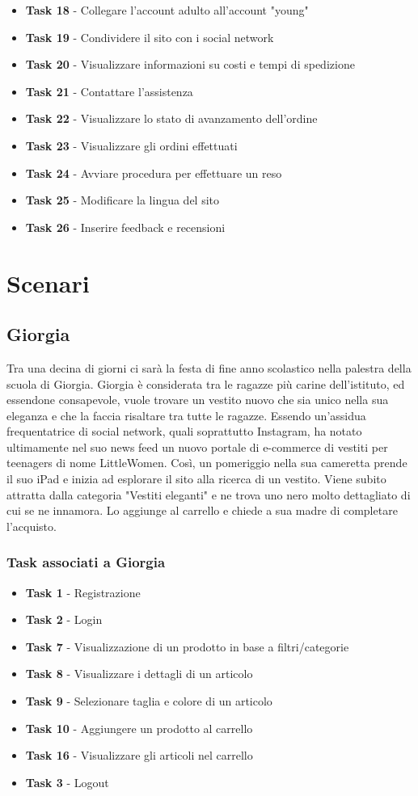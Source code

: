 \documentclass[12pt,a4paper]{report}
\begin{document}
\begin{itemize}
  \item \textbf{Task 18} - Collegare l'account adulto all'account "young"
  \item \textbf{Task 19} - Condividere il sito con i social network
  \item \textbf{Task 20} - Visualizzare informazioni su costi e tempi di spedizione
  \item \textbf{Task 21} - Contattare l'assistenza
  \item \textbf{Task 22} - Visualizzare lo stato di avanzamento dell'ordine
  \item \textbf{Task 23} - Visualizzare gli ordini effettuati
  \item \textbf{Task 24} - Avviare procedura per effettuare un reso
  \item \textbf{Task 25} - Modificare la lingua del sito
  \item \textbf{Task 26} - Inserire feedback e recensioni
\end{itemize}
\section{Scenari}
\subsection*{Giorgia}
Tra una decina di giorni ci sarà la festa di fine anno scolastico nella palestra della scuola di Giorgia. Giorgia è considerata tra le ragazze più carine dell'istituto, ed essendone consapevole, vuole trovare un vestito nuovo che sia unico nella sua eleganza e che la faccia risaltare tra tutte le ragazze. Essendo un'assidua frequentatrice di social network, quali soprattutto Instagram, ha notato ultimamente nel suo news feed un nuovo portale di e-commerce di vestiti per teenagers di nome LittleWomen. Così, un pomeriggio nella sua cameretta prende il suo iPad e inizia ad esplorare il sito alla ricerca di un vestito. Viene subito attratta dalla categoria "Vestiti eleganti" e ne trova uno nero molto dettagliato di cui se ne innamora. Lo aggiunge al carrello e chiede a sua madre di completare l'acquisto.
\subsubsection*{Task associati a Giorgia}
\begin{itemize}
\item \textbf{Task 1} - Registrazione
\item \textbf{Task 2} - Login
\item \textbf{Task 7} - Visualizzazione di un prodotto in base a filtri/categorie
\item \textbf{Task 8} - Visualizzare i dettagli di un articolo
\item \textbf{Task 9} - Selezionare taglia e colore di un articolo
\item \textbf{Task 10} - Aggiungere un prodotto al carrello
\item \textbf{Task 16} - Visualizzare gli articoli nel carrello
\item \textbf{Task 3} - Logout
\end{itemize}
\end{document}
